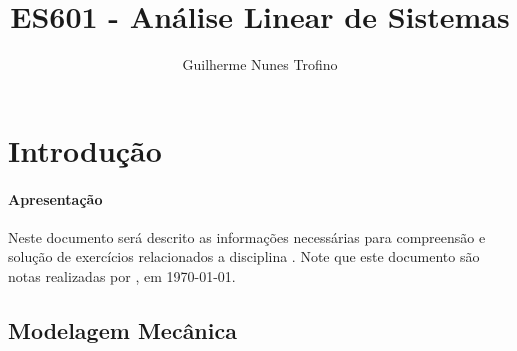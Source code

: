 \documentclass{article}
\title{ES601 - Análise Linear de Sistemas}
\author{Guilherme Nunes Trofino}
\begin{document}
    \maketitle
\newpage

    \tableofcontents
\newpage

    \section{Introdução}
        \paragraph{Apresentação}Neste documento será descrito as informações necessárias para compreensão e solução de exercícios relacionados a disciplina \thetitle . Note que este documento são notas realizadas por \theauthor , em \today.

        \subsection{Modelagem Mecânica}
\end{document}
